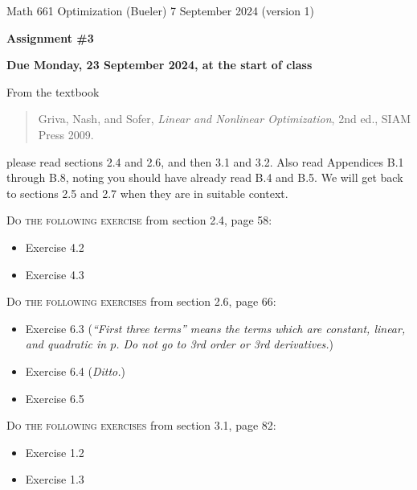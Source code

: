 \documentclass[12pt]{amsart}
\begin{document}
\scriptsize \noindent Math 661 Optimization (Bueler) \hfill 7 September 2024 (version 1)
\normalsize

\medskip\bigskip

\Large\centerline{\textbf{Assignment \#3}}
\large
\bigskip

\centerline{\textbf{Due Monday, 23 September 2024, at the start of class}}
\bigskip
\normalsize

\thispagestyle{empty}

\bigskip
\noindent From the textbook

\begin{quote}
Griva, Nash, and Sofer, \emph{Linear and Nonlinear Optimization}, 2nd ed., SIAM Press 2009.
\end{quote}

\noindent please read sections 2.4 and 2.6, and then 3.1 and 3.2.  Also read Appendices B.1 through B.8, noting you should have already read B.4 and B.5.  We will get back to sections 2.5 and 2.7 when they are in suitable context.

\bigskip
\noindent \textsc{Do the following exercise} from section 2.4, page 58:

\begin{itemize}
\item Exercise 4.2
\item Exercise 4.3
\end{itemize}

\bigskip
\noindent \textsc{Do the following exercises} from section 2.6, page 66:

\begin{itemize}
\item Exercise 6.3 (\emph{``First three terms'' means the terms which are constant, linear, and quadratic in $p$.  Do not go to 3rd order or 3rd derivatives.})
\item Exercise 6.4 (\emph{Ditto.})
\item Exercise 6.5
\end{itemize}

\bigskip
\noindent \textsc{Do the following exercises} from section 3.1, page 82:

\begin{itemize}
\item Exercise 1.2
\item Exercise 1.3
\end{itemize}
\end{document}
